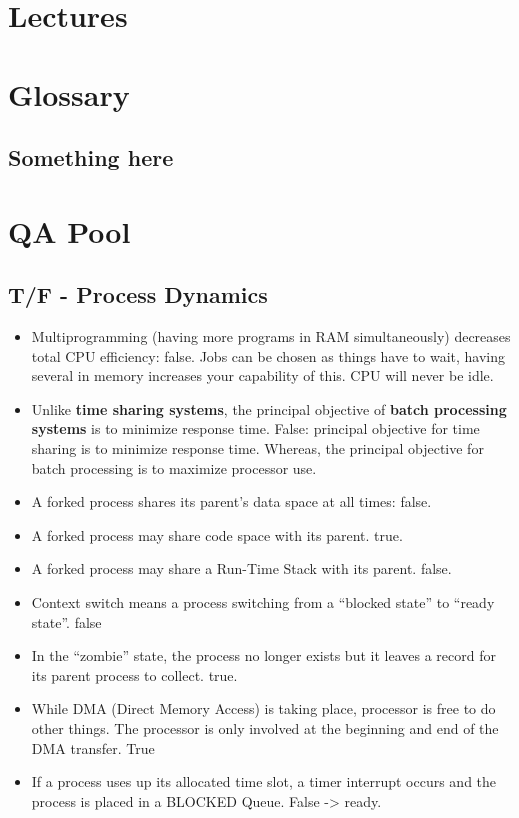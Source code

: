 \documentclass[fontsize=5pt]{scrartcl}
\begin{document}
\begin{multicols}{3}
\begin{itemize}
        \end{itemize}


      
  \section{Lectures}
    
      
  \section{Glossary}
    \subsection{Something here}
    
  \section{QA Pool}
    \subsection{T/F - Process Dynamics}
        \begin{itemize}
          \item Multiprogramming (having more programs in RAM simultaneously) decreases total CPU efficiency: false. Jobs can be chosen as things have to wait, having several
                in memory increases your capability of this. CPU will never be idle.
          \item Unlike \textbf{time sharing systems}, the principal objective of \textbf{batch processing systems} is to minimize response time. False: principal objective for time sharing is to 
                minimize response time. Whereas, the principal objective for batch processing is to maximize processor use.
          \item A forked process shares its parent's data space at all times: false.
          \item A forked process may share code space with its parent. true.
          \item A forked process may share a Run-Time Stack with its parent. false.
          \item Context switch means a process switching from a ``blocked state'' to ``ready state''. false
          \item In the ``zombie'' state, the process no longer exists but it leaves a record for its parent process to collect. true.
          \item While DMA (Direct Memory Access) is taking place, processor is free
                to do other things. The processor is only involved at the beginning
                and end of the DMA transfer. True
          \item If a process uses up its allocated time slot, a timer interrupt occurs
                and the process is placed in a BLOCKED Queue. False -> ready.
          

\end{itemize}
\end{multicols}
\end{document}
